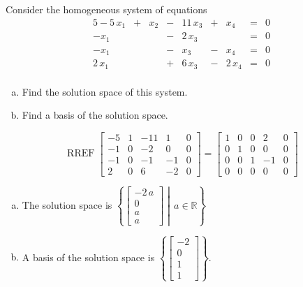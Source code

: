 
\begin{exerciseStatement}


Consider the homogeneous system of equations 
\begin{alignat*}{5} -5 \, x_{1} &+& x_{2} &-& 11 \, x_{3} &+& x_{4} &=& 0 \\-x_{1} & &  &-& 2 \, x_{3} & &  &=& 0 \\-x_{1} & &  &-& x_{3} &-& x_{4} &=& 0 \\2 \, x_{1} & &  &+& 6 \, x_{3} &-& 2 \, x_{4} &=& 0 \\ \end{alignat*}
            


\begin{enumerate}[(a)]
\item  Find the solution space of this system.
\item  Find a basis of the solution space.
\end{enumerate}
    
\end{exerciseStatement}
    
\begin{exerciseAnswer} 


\[\operatorname{RREF} \left[\begin{array}{cccc|c}
-5 & 1 & -11 & 1 & 0 \\
-1 & 0 & -2 & 0 & 0 \\
-1 & 0 & -1 & -1 & 0 \\
2 & 0 & 6 & -2 & 0
\end{array}\right] = \left[\begin{array}{cccc|c}
1 & 0 & 0 & 2 & 0 \\
0 & 1 & 0 & 0 & 0 \\
0 & 0 & 1 & -1 & 0 \\
0 & 0 & 0 & 0 & 0
\end{array}\right] \]


\begin{enumerate}[(a)]
\item The solution space is \( \left\{ \left[\begin{array}{c}
-2 \, a \\
0 \\
a \\
a
\end{array}\right] \middle|\,a\in\mathbb{R}\right\} \)
\item A basis of the solution space is \( \left\{ \left[\begin{array}{c}
-2 \\
0 \\
1 \\
1
\end{array}\right] \right\} \).
\end{enumerate}
    
\end{exerciseAnswer}
    
